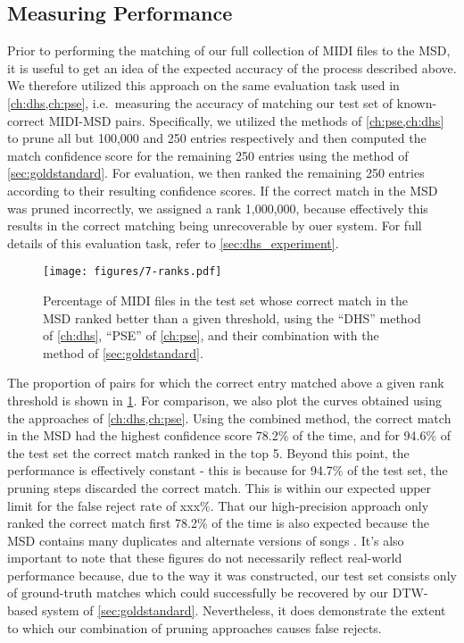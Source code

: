 \subsection{Measuring Performance}

Prior to performing the matching of our full collection of MIDI files to the MSD, it is useful to get an idea of the expected accuracy of the process described above.
We therefore utilized this approach on the same evaluation task used in \cref{ch:dhs,ch:pse}, i.e.\ measuring the accuracy of matching our test set of known-correct MIDI-MSD pairs.
Specifically, we utilized the methods of \cref{ch:pse,ch:dhs} to prune all but 100,000 and 250 entries respectively and then computed the match confidence score for the remaining 250 entries using the method of \cref{sec:goldstandard}.
For evaluation, we then ranked the remaining 250 entries according to their resulting confidence scores.
If the correct match in the MSD was pruned incorrectly, we assigned a rank 1,000,000, because effectively this results in the correct matching being unrecoverable by ouer system.
For full details of this evaluation task, refer to \cref{sec:dhs_experiment}.

\begin{figure}
  \texttt{[image: figures/7-ranks.pdf]}
  \caption[Percentage of the test set below a given rank]{Percentage of MIDI files in the test set whose correct match in the MSD ranked better than a given threshold, using the ``DHS'' method of \cref{ch:dhs}, ``PSE'' of \cref{ch:pse}, and their combination with the method of \cref{sec:goldstandard}.}
  \label{fig:combined_ranks}
\end{figure}

The proportion of pairs for which the correct entry matched above a given rank threshold is shown in \cref{fig:combined_ranks}.
For comparison, we also plot the curves obtained using the approaches of \cref{ch:dhs,ch:pse}.
Using the combined method, the correct match in the MSD had the highest confidence score 78.2\% of the time, and for 94.6\% of the test set the correct match ranked in the top 5.
Beyond this point, the performance is effectively constant - this is because for 94.7\% of the test set, the pruning steps discarded the correct match.
This is within our expected upper limit for the false reject rate of xxx\%.
That our high-precision approach only ranked the correct match first 78.2\% of the time is also expected because the MSD contains many duplicates and alternate versions of songs \cite{bertin2012large}.
It's also important to note that these figures do not necessarily reflect real-world performance because, due to the way it was constructed, our test set consists only of ground-truth matches which could successfully be recovered by our DTW-based system of \cref{sec:goldstandard}.
Nevertheless, it does demonstrate the extent to which our combination of pruning approaches causes false rejects.

